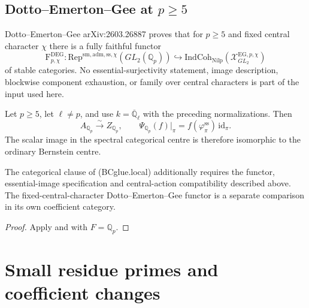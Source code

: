 \subsection{Dotto--Emerton--Gee at \(p\geq 5\)}

\begin{theorem}
\label{v4-arith:w10-e:thm:deg-fully-faithful}
\ClaimStatusProvedElsewhere Dotto--Emerton--Gee arXiv:2603.26887
proves that for \(p\geq 5\) and fixed central character \(\chi\) there
is a fully faithful functor
\begin{equation}
\label{v4-arith:w10-e:eq:deg-functor}
\mathrm{F}^{\mathrm{DEG}}_{p,\chi}\colon
\mathrm{Rep}^{\mathrm{sm,adm,ss},\chi}(GL_{2}(\mathbb{Q}_{p}))
\hookrightarrow
\mathrm{IndCoh}_{\mathrm{Nilp}}(\mathcal{X}^{\mathrm{EG},p,\chi}_{GL_{2}})
\end{equation}
of stable categories.  No essential-surjectivity statement, image
description, blockwise component exhaustion, or family over central
characters is part of the input used here.
\end{theorem}

\begin{corollary}
\label{v4-arith:w10-e:cor:bcglue-local-tame-odd}
\ClaimStatusProvedHere
Let \(p\geq5\), let \(\ell\neq p\), and use
\(k=\overline{\mathbb Q}_{\ell}\) with the preceding
normalizations. Then
\[
 A_{\mathbb Q_p}\xrightarrow{\sim}Z_{\mathbb Q_p},
 \qquad
 \Psi_{\mathbb Q_p}(f)|_\pi
   =f(\varphi_\pi^{\mathrm{ss}})\,\mathrm{id}_\pi.
\]
The scalar image in the spectral categorical centre
is therefore isomorphic to the ordinary Bernstein
centre.

The categorical clause of (BCglue.local) additionally
requires the functor, essential-image specification
and central-action compatibility described above.
The fixed-central-character Dotto--Emerton--Gee
functor is a separate comparison in its own
coefficient category.
\end{corollary}

\begin{proof}
Apply 
and 
with \(F=\mathbb Q_p\).
\end{proof}

\section{Small residue primes and coefficient changes}
\label{v4-arith:w10-e:wild}

